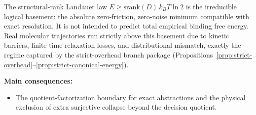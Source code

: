 The structural-rank Landauer law
\(
E\ge \mathrm{srank}(D)\,k_B T\ln 2
\)
is the irreducible logical basement: the absolute zero-friction, zero-noise minimum compatible with exact resolution. It is not intended to predict total empirical binding free energy. Real molecular trajectories run strictly above this basement due to kinetic barriers, finite-time relaxation losses, and distributional mismatch, exactly the regime captured by the strict-overhead branch package (Propositions~\ref{prop:strict-overhead}--\ref{prop:strict-canonical-energy}).

\textbf{Main consequences:}
\begin{itemize}
\item The quotient-factorization boundary for exact abstractions and the physical exclusion of extra surjective collapse beyond the decision quotient.

\end{itemize}
